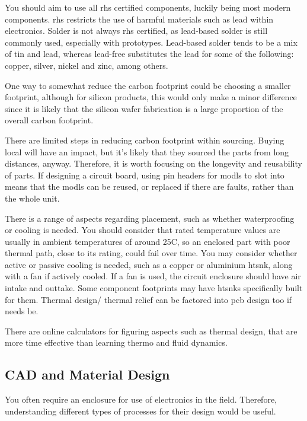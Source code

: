 \documentclass[a4paper,11pt]{report}
\begin{document}
You should aim to use all \gls{rhs} certified components, luckily being most modern components. \gls{rhs} restricts the use of harmful materials such as lead within electronics. Solder is not always \gls{rhs} certified, as lead-based solder is still commonly used, especially with prototypes. Lead-based solder tends to be a mix of tin and lead, whereas lead-free substitutes the lead for some of the following: copper, silver, nickel and zinc, among others.

One way to somewhat reduce the carbon footprint could be choosing a smaller footprint, although for silicon products, this would only make a minor difference since it is likely that the silicon wafer fabrication is a large proportion of the overall carbon footprint.

There are limited steps in reducing carbon footprint within sourcing. Buying local will have an impact, but it's likely that they sourced the parts from long distances, anyway. Therefore, it is worth focusing on the longevity and reusability of parts. If designing a circuit board, using pin headers for \gls{modl}s to slot into means that the \gls{modl}s can be reused, or replaced if there are faults, rather than the whole unit.

There is a range of aspects regarding placement, such as whether waterproofing or cooling is needed. You should consider that rated temperature values are usually in ambient temperatures of around 25\degree C, so an enclosed part with poor thermal path, close to its rating, could fail over time. You may consider whether active or passive cooling is needed, such as a copper or aluminium \gls{htsnk}, along with a fan if actively cooled. If a fan is used, the circuit enclosure should have air intake and outtake. Some component footprints may have \gls{htsnk}s specifically built for them. Thermal design/ thermal relief can be factored into \gls{pcb} design too if needs be.

There are online calculators for figuring aspects such as thermal design, that are more time effective than learning thermo and fluid dynamics.

\vspace*{1\baselineskip}

\subsection{CAD and Material Design}

You often require an enclosure for use of electronics in the field. Therefore, understanding different types of processes for their design would be useful.
\end{document}
